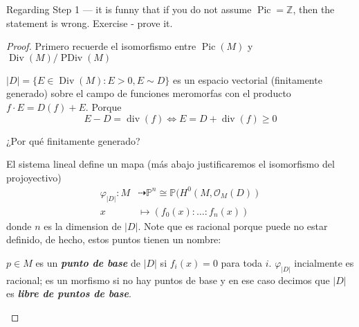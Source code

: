 \begin{remark}[Sergey]\leavevmode
Regarding Step 1 — it is funny that if you do not assume $\operatorname{Pic} = \mathbb{Z}$, then the statement is wrong. Exercise - prove it.
	
\end{remark}

\begin{proof}\leavevmode

	Primero recuerde el isomorfismo entre $\operatorname{Pic}(M)$ y $\operatorname{Div}(M)/\operatorname{PDiv}(M)$

\begin{claim}\leavevmode
	$ |D| =\{E\in\operatorname{Div}(M):E>0, E\sim D\} $ es un espacio vectorial (finitamente generado) sobre el campo de funciones meromorfas con el producto $f\cdot E= D(f)+E$. Porque
	\[E-D=\operatorname{div}(f)\iff E=D+\operatorname{div}(f)\geq 0\]
\end{claim}

\begin{question}\leavevmode
	¿Por qué finitamente generado?
\end{question}

El sistema lineal define un mapa (más abajo justificaremos el isomorfismo del projoyectivo)
\begin{align*}
	\varphi_{|D|}:M&\dashrightarrow \mathbb{P}^n\cong \mathbb{P}(H^{0}(M,\mathcal{O}_M(D))\\
	x&\longmapsto(f_0(x):\ldots :f_n(x))
\end{align*}
donde $n$ es la dimension de $|D|$. Note que es racional porque puede no estar definido, de hecho, estos puntos tienen un nombre:

\begin{defn}\leavevmode
	$p\in M$ es un \textit{\textbf{punto de base}} de  $|D|$ si $f_i(x)=0$ para toda $i$. $\varphi_{|D|}$ incialmente es racional; es un morfismo si no hay puntos de base y en ese caso decimos que $|D|$ es \textit{\textbf{libre de puntos de base}}.
\end{defn}


\end{proof}
